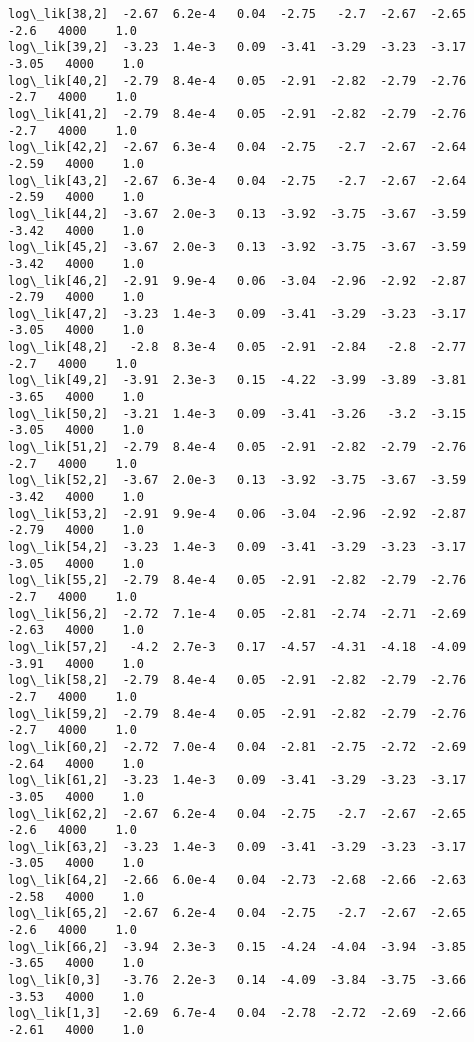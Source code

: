 \documentclass[11pt]{article}
\begin{document}
\begin{Verbatim}[commandchars=\\\{\}]
log\_lik[38,2]  -2.67  6.2e-4   0.04  -2.75   -2.7  -2.67  -2.65   -2.6   4000    1.0
log\_lik[39,2]  -3.23  1.4e-3   0.09  -3.41  -3.29  -3.23  -3.17  -3.05   4000    1.0
log\_lik[40,2]  -2.79  8.4e-4   0.05  -2.91  -2.82  -2.79  -2.76   -2.7   4000    1.0
log\_lik[41,2]  -2.79  8.4e-4   0.05  -2.91  -2.82  -2.79  -2.76   -2.7   4000    1.0
log\_lik[42,2]  -2.67  6.3e-4   0.04  -2.75   -2.7  -2.67  -2.64  -2.59   4000    1.0
log\_lik[43,2]  -2.67  6.3e-4   0.04  -2.75   -2.7  -2.67  -2.64  -2.59   4000    1.0
log\_lik[44,2]  -3.67  2.0e-3   0.13  -3.92  -3.75  -3.67  -3.59  -3.42   4000    1.0
log\_lik[45,2]  -3.67  2.0e-3   0.13  -3.92  -3.75  -3.67  -3.59  -3.42   4000    1.0
log\_lik[46,2]  -2.91  9.9e-4   0.06  -3.04  -2.96  -2.92  -2.87  -2.79   4000    1.0
log\_lik[47,2]  -3.23  1.4e-3   0.09  -3.41  -3.29  -3.23  -3.17  -3.05   4000    1.0
log\_lik[48,2]   -2.8  8.3e-4   0.05  -2.91  -2.84   -2.8  -2.77   -2.7   4000    1.0
log\_lik[49,2]  -3.91  2.3e-3   0.15  -4.22  -3.99  -3.89  -3.81  -3.65   4000    1.0
log\_lik[50,2]  -3.21  1.4e-3   0.09  -3.41  -3.26   -3.2  -3.15  -3.05   4000    1.0
log\_lik[51,2]  -2.79  8.4e-4   0.05  -2.91  -2.82  -2.79  -2.76   -2.7   4000    1.0
log\_lik[52,2]  -3.67  2.0e-3   0.13  -3.92  -3.75  -3.67  -3.59  -3.42   4000    1.0
log\_lik[53,2]  -2.91  9.9e-4   0.06  -3.04  -2.96  -2.92  -2.87  -2.79   4000    1.0
log\_lik[54,2]  -3.23  1.4e-3   0.09  -3.41  -3.29  -3.23  -3.17  -3.05   4000    1.0
log\_lik[55,2]  -2.79  8.4e-4   0.05  -2.91  -2.82  -2.79  -2.76   -2.7   4000    1.0
log\_lik[56,2]  -2.72  7.1e-4   0.05  -2.81  -2.74  -2.71  -2.69  -2.63   4000    1.0
log\_lik[57,2]   -4.2  2.7e-3   0.17  -4.57  -4.31  -4.18  -4.09  -3.91   4000    1.0
log\_lik[58,2]  -2.79  8.4e-4   0.05  -2.91  -2.82  -2.79  -2.76   -2.7   4000    1.0
log\_lik[59,2]  -2.79  8.4e-4   0.05  -2.91  -2.82  -2.79  -2.76   -2.7   4000    1.0
log\_lik[60,2]  -2.72  7.0e-4   0.04  -2.81  -2.75  -2.72  -2.69  -2.64   4000    1.0
log\_lik[61,2]  -3.23  1.4e-3   0.09  -3.41  -3.29  -3.23  -3.17  -3.05   4000    1.0
log\_lik[62,2]  -2.67  6.2e-4   0.04  -2.75   -2.7  -2.67  -2.65   -2.6   4000    1.0
log\_lik[63,2]  -3.23  1.4e-3   0.09  -3.41  -3.29  -3.23  -3.17  -3.05   4000    1.0
log\_lik[64,2]  -2.66  6.0e-4   0.04  -2.73  -2.68  -2.66  -2.63  -2.58   4000    1.0
log\_lik[65,2]  -2.67  6.2e-4   0.04  -2.75   -2.7  -2.67  -2.65   -2.6   4000    1.0
log\_lik[66,2]  -3.94  2.3e-3   0.15  -4.24  -4.04  -3.94  -3.85  -3.65   4000    1.0
log\_lik[0,3]   -3.76  2.2e-3   0.14  -4.09  -3.84  -3.75  -3.66  -3.53   4000    1.0
log\_lik[1,3]   -2.69  6.7e-4   0.04  -2.78  -2.72  -2.69  -2.66  -2.61   4000    1.0

\end{Verbatim}
\end{document}
